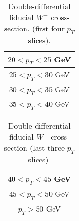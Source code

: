 \begin{table}
\footnotesize
  \begin{center}
\begin{tabular}{lc}
\hline

\hline
\multicolumn{2}{c}{$20 < p_T < 25$ GeV} \\
\hline


\hline
\multicolumn{2}{c}{$25 < p_T < 30$ GeV} \\
\hline


\hline
\multicolumn{2}{c}{$30 < p_T < 35$ GeV} \\
\hline


\hline
\multicolumn{2}{c}{$35 < p_T < 40$ GeV} \\
\hline


    \hline
    \end{tabular}
    \caption{ Double-differential fiducial $W^-$ cross-section. (first four $p_T$ slices). }
    \label{tab:Wmn:XS_NEG_2D_pt20_1}
  \end{center}
\end{table}

\begin{table}
\footnotesize
  \begin{center}
\begin{tabular}{lc}
\hline

\hline
\multicolumn{2}{c}{$40 < p_T < 45$ GeV} \\
\hline


\hline
\multicolumn{2}{c}{$45 < p_T < 50$ GeV} \\
\hline


\hline
\multicolumn{2}{c}{$p_T > 50$ GeV} \\
\hline


    \hline
    \end{tabular}
    \caption{ Double-differential fiducial $W^-$ cross-section (last three $p_T$ slices). }
    \label{tab:Wmn:XS_NEG_2D_pt20_2}
  \end{center}
\end{table}


